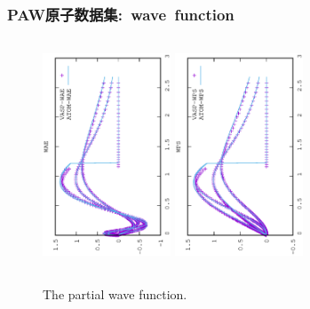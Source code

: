 \documentclass[cjk,slidestop,compress,mathserif,blue]{beamer}
\begin{document}
\frame
{
	\frametitle{\textrm{PAW}原子数据集:~\textrm{wave~function}}
\begin{figure}[h!]
\centering
\vskip -0.5in
\includegraphics[width=1.5in,height=2.7in,viewport=0 0 350 550, angle=-90, clip]{Figures/WAE_data.eps}
\vskip -0.2in
\includegraphics[height=2.7in,width=1.5in,viewport=0 0 350 550, angle=-90, clip]{Figures/WPS_data.eps}
\caption{\tiny \textrm{The partial wave function.}}%
\label{Wave_Function}
\end{figure}
}
\end{document}
